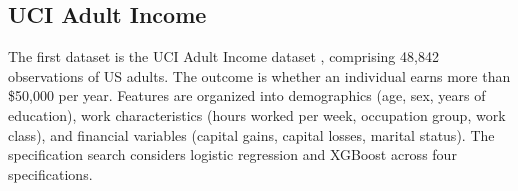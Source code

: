 \documentclass[conference]{IEEEtran}
\begin{document}
	\subsection{UCI Adult Income}
	
	The first dataset is the UCI Adult Income dataset \cite{UCI, kohavi1996}, comprising 48,842 observations of US adults. The outcome is whether an individual earns more than \$50,000 per year. Features are organized into demographics (age, sex, years of education), work characteristics (hours worked per week, occupation group, work class), and financial variables (capital gains, capital losses, marital status). The specification search considers logistic regression and XGBoost across four specifications.
	
	\begin{table}[htbp]
		\centering
		\small
		
\end{table}
\end{document}
